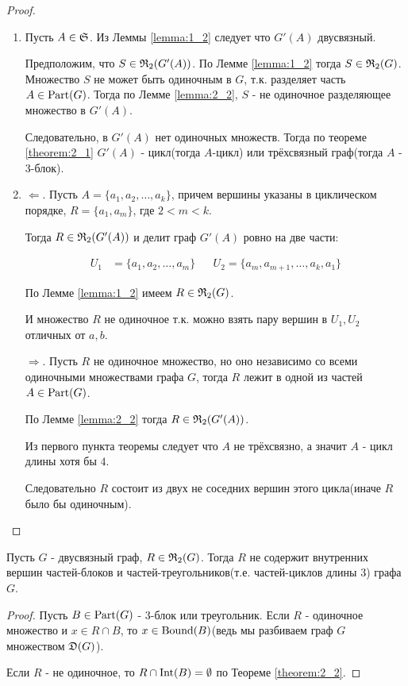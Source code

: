 \begin{proof}
	\begin{enumerate}
		\item Пусть $A \in \S$.
			Из Леммы \ref{lemma:1_2} следует что $G'(A)$ двусвязный.

			Предположим, что $S \in \R_2(G'(A))$.
			По Лемме \ref{lemma:1_2} тогда $S \in \R_2(G)$.
			Множество $S$ не может быть одиночным в $G$, т.к. разделяет часть $A \in \Part(G)$.
			Тогда по Лемме \ref{lemma:2_2}, $S$ - не одиночное разделяющее множество в  $G'(A)$.

			Следовательно, в  $G'(A)$ нет одиночных множеств.
			Тогда по теореме \ref{theorem:2_1} $G'(A)$ - цикл(тогда $A$-цикл) или трёхсвязный граф(тогда $A$ - 3-блок).

		\item $\Longleftarrow$. Пусть  $A = \{ a_1, a_2, \ldots, a_k \}$, причем вершины указаны в циклическом порядке, $R = \{a_1, a_m\}$, где  $2 < m < k$.

			Тогда  $R \in \R_2(G'(A))$ и делит граф  $G'(A)$ ровно на две части:

			\begin{align*}
				U_1 &= \{a_1, a_2, \ldots, a_m\} && U_2 = \{a_m, a_{m+1}, \ldots, a_k, a_1\}
			\end{align*}

			По Лемме \ref{lemma:1_2} имеем $R \in \R_2(G)$.

			И множество $R$ не одиночное т.к. можно взять пару вершин в $U_1, U_2$ отличных от $a, b$.

			$\Longrightarrow$. Пусть $R$ не одиночное множество, но оно независимо со всеми одиночными множествами графа  $G$, тогда $R$ лежит в одной из частей $A \in \Part(G)$.

			По Лемме \ref{lemma:2_2} тогда $R \in \R_2(G'(A))$.

			Из первого пункта теоремы  следует что $A$ не трёхсвязно, а значит $A$ - цикл длины хотя бы $4$.

			Следовательно  $R$ состоит из двух не соседних вершин этого цикла(иначе $R$ было бы одиночным).

	\end{enumerate}
\end{proof}


\begin{crly}[Следствие 2.1] \label{corollary:2_1}
	Пусть $G$ - двусвязный граф, $R \in \R_2(G)$. Тогда $R$ не содержит внутренних вершин частей-блоков и частей-треугольников(т.е. частей-циклов длины 3) графа $G$.
\end{crly}
\begin{proof}
	Пусть $B \in \Part(G)$ - 3-блок или треугольник.
	Если  $R$ - одиночное множество и $x \in R \cap B$, то $x \in \Bound(B)$(ведь мы разбиваем граф $G$ множеством $\D(G)$).
	
	Если  $R$ - не одиночное, то $R \cap \Int(B) = \emptyset$ по Теореме \ref{theorem:2_2}.
\end{proof}

